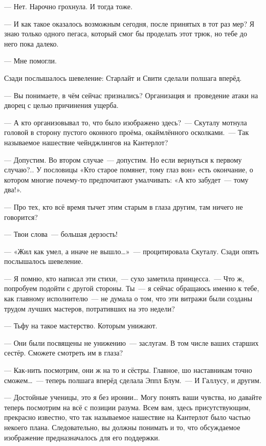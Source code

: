 \documentclass[fontsize=11pt,a5paper,titlepage=firstcover]{scrbook}
\begin{document}
--- Нет. Нарочно грохнула. И тогда тоже.

--- И как такое оказалось возможным сегодня, после принятых в тот раз мер? Я знаю только одного пегаса, который смог бы проделать этот трюк, но тебе до него пока далеко.

--- Мне помогли.

Сзади послышалось шевеление: Старлайт и Свити сделали полшага вперёд.

--- Вы понимаете, в чём сейчас признались? Организация и~проведение атаки на дворец с целью причинения ущерба.

--- А кто организовывал то, что было изображено здесь?~--- Скуталу мотнула головой в сторону пустого оконного проёма, окаймлённого осколками.~--- Так называемое нашествие чейнджлингов на Кантерлот?

--- Допустим. Во втором случае~--- допустим. Но если вернуться к первому случаю?.. У пословицы «Кто старое помянет, тому глаз вон» есть окончание, о котором многие почему-то предпочитают умалчивать: «А кто забудет~--- тому два!».

--- Про тех, кто всё время тычет этим старым в глаза другим, там ничего не говорится?

--- Твои слова~--- большая дерзость!

--- «Жил как умел, а иначе не вышло{\ldots}»~--- процитировала Скуталу. Сзади опять послышалось шевеление.

--- Я помню, кто написал эти стихи,~--- сухо заметила принцесса.~--- Что ж, попробуем подойти с другой стороны. Ты~--- я сейчас обращаюсь именно к тебе, как главному исполнителю~--- не думала о том, что эти витражи были созданы трудом лучших мастеров, потративших на это недели?

--- Тьфу на такое мастерство. Которым унижают.

--- Они были посвящены не унижению~--- заслугам. В том числе ваших старших сестёр. Сможете смотреть им в глаза?

--- Как-нить посмотрим, они ж на то и сёстры. Главное, шо наставникам точно сможем{\ldots}~--- теперь полшага вперёд сделала Эппл Блум.~--- И Галлусу, и другим.

--- Достойные ученицы, это я без иронии{\ldots} Могу понять ваши чувства, но давайте теперь посмотрим на всё с позиции разума. Всем вам, здесь присутствующим, прекрасно известно, что так называемое нашествие на Кантерлот было частью некоего плана. Следовательно, вы должны понимать и то, что обсуждаемое изображение предназначалось для его поддержки.
\end{document}
